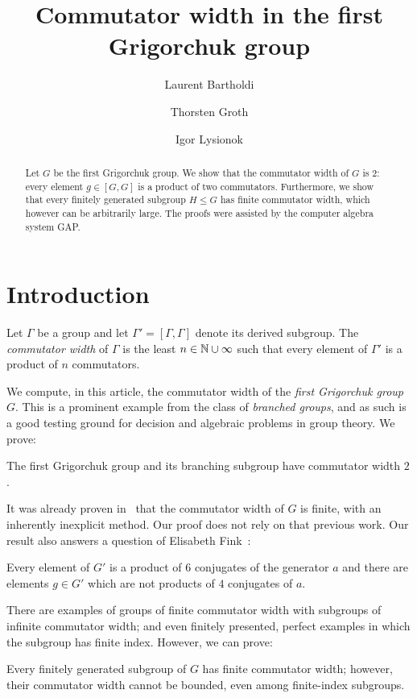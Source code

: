 \documentclass[a4paper,11pt]{amsart}
\begin{document}
\title{Commutator width in the first Grigorchuk group}
\author{Laurent Bartholdi}
\author{Thorsten Groth}
\author{Igor Lysionok}
\begin{abstract}
  Let $G$ be the first Grigorchuk group.  We show that the commutator
  width of $G$ is $2$: every element $g\in [G,G]$ is a product of two
  commutators. Furthermore, we show that every finitely generated
  subgroup $H\leq G$ has finite commutator width, which however can be
  arbitrarily large. The proofs were assisted by the computer algebra
  system GAP.
\end{abstract}
\maketitle

\section{Introduction}
Let $\Gamma$ be a group and let $\Gamma'=[\Gamma,\Gamma]$ denote its
derived subgroup. The \emph{commutator width} of $\Gamma$ is the least
$n\in \mathbb{N}\cup \infty$ such that every element of $\Gamma'$ is a
product of $n$ commutators.

We compute, in this article, the commutator width of the \emph{first
  Grigorchuk group} $G$. This is a prominent example from the class of
\emph{branched groups}, and as such is a good testing ground for
decision and algebraic problems in group theory. We prove:
\begin{thma}\label{thm:CWGrigorchukGroup}
  The first Grigorchuk group and its branching subgroup have
  commutator width $2$.
\end{thma}
It was already proven in~\cite{Lysenok:QudraticEquationsInGrig} that
the commutator width of $G$ is finite, with an inherently inexplicit
method. Our proof does not rely on that previous work. Our result also
answers a question of Elisabeth
Fink~\cite[Question~3]{Fink:Conjugacy_growth}:
\begin{cora}\label{cor:productOf6Conjugates}
  Every element of $G'$ is a product of $6$ conjugates of the
  generator $a$ and there are elements $g\in G'$ which are 
  not products of $4$ conjugates of $a$.
\end{cora}


There are examples of groups of finite commutator width with subgroups
of infinite commutator width; and even finitely presented, perfect
examples in which the subgroup has finite index. However, we can
prove:
\begin{thma}\label{thm:subgroups}
  Every finitely generated subgroup of $G$ has finite commutator
  width; however, their commutator width cannot be bounded, even among
  finite-index subgroups.
\end{thma}
\end{document}
